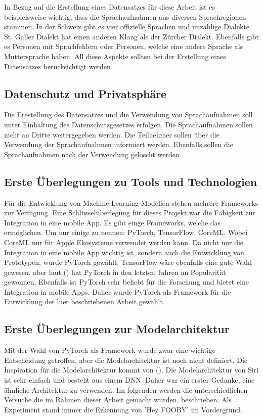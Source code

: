 \documentclass[11pt,a4paper]{article}
\begin{document}
\noindent \newline
In Bezug auf die Erstellung eines Datensatzes für diese Arbeit ist es beispielsweise wichtig, dass 
die Sprachaufnahmen aus diversen Sprachregionen stammen. In der Schweiz gibt es vier offizielle 
Sprachen und unzählige Dialekte. St. Galler Dialekt hat einen anderen Klang als der Zürcher Dialekt.
Ebenfalls gibt es Personen mit Sprachfehlern oder Personen, welche eine andere Sprache als 
Muttersprache haben. All diese Aspekte sollten bei der Erstellung eines Datensatzes berücksichtigt 
werden.

\subsection{Datenschutz und Privatsphäre}
Die Erestellung des Datensatzes und die Verwendung von Sprachaufnahmen soll unter Einhaltung des 
Datenschutzgesetzes erfolgen. Die Sprachaufnahmen sollen nicht an Dritte weitergegeben werden. Die 
Teilnehmer sollen über die Verwendung der Sprachaufnahmen informiert werden. Ebenfalls sollen die 
Sprachaufnahmen nach der Verwendung gelöscht werden. 

\subsection{Erste Überlegungen zu Tools und Technologien}
Für die Entwicklung von Machine-Learning-Modellen stehen mehrere Frameworks zur Verfügung. Eine 
Schlüsselüberlegung für dieses Projekt war die Fähigkeit zur Integration in eine mobile App.
Es gibt einge Frameworks, welche das ermöglichen. Um nur einige zu nennen: PyTorch, TensorFlow, 
CoreML. Wobei CoreML nur für Apple Ekosysteme verwendet werden kann. Da nicht nur die Integration
in eine mobile App wichtig ist, sondern auch die Entwicklung von Prototypen, wurde PyTorch gewählt.
TensorFlow wäre ebenfalls eine gute Wahl gewesen, aber laut (\cite{valantis2023battle}) hat PyTorch 
in den letzten Jahren an Popularität gewonnen. Ebenfalls ist PyTorch sehr beliebt für die 
Forschung und bietet eine Integration in mobile Apps. Daher wurde PyTorch als Framework für die 
Entwicklung der hier beschriebenen Arbeit gewählt.

\subsection{Erste Überlegungen zur Modelarchitektur}
Mit der Wahl von PyTorch als Framework wurde zwar eine wichtige Entscheidung getroffen, aber die 
Modelarchitektur ist noch nicht definiert. Die Inspiration für die Modelarchitektur kommt von 
(\cite{siri2017hey}). Die Modelarchitektur von Siri ist sehr einfach und besteht aus einem DNN. 
Daher war ein erster Gedanke, eine ähnliche Architektur zu verwenden. Im folgenden werden die 
unterschiedlichen Versuche die im Rahmen dieser Arbeit gemacht wurden, beschrieben. Als Experiment 
stand immer die Erkennung von 'Hey FOOBY' im Vordergrund.
\end{document}
